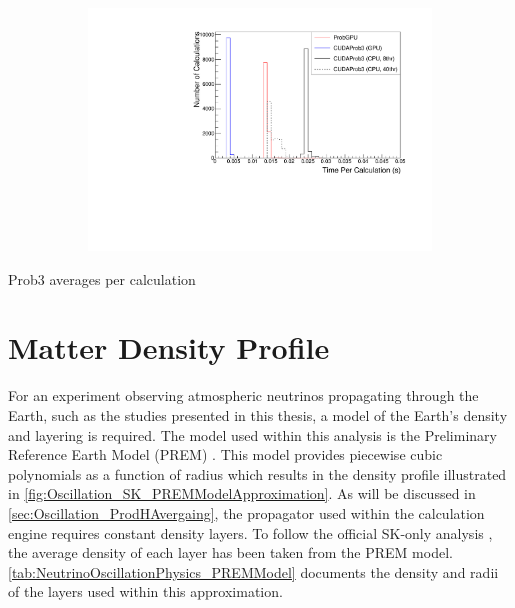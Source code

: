 \begin{figure}[h]
  \begin{subfigure}[t]{0.8\textwidth}
    \includegraphics[width=\textwidth, trim={0mm 0mm 0mm 0mm}, clip,page=1]{Figures/Oscillation/CalculationTime.pdf}
  \end{subfigure}
  \caption{}
  \label{fig:Oscillation_CalculationTime}
\end{figure}

Prob3 averages  per calculation

\section{Matter Density Profile}
\label{sec:Oscillation_MatterDensity}

For an experiment observing atmospheric neutrinos propagating through the Earth, such as the studies presented in this thesis, a model of the Earth's density and layering is required. The model used within this analysis is the Preliminary Reference Earth Model (PREM) \cite{Dziewonski1981-sp}. This model provides piecewise cubic polynomials as a function of radius which results in the density profile illustrated in \autoref{fig:Oscillation_SK_PREMModelApproximation}. As will be discussed in \autoref{sec:Oscillation_ProdHAvergaing}, the propagator used within the calculation engine requires constant density layers. To follow the official SK-only analysis \cite{thesis_roger}, the average density of each layer has been taken from the PREM model. \autoref{tab:NeutrinoOscillationPhysics_PREMModel} documents the density and radii of the layers used within this approximation.

